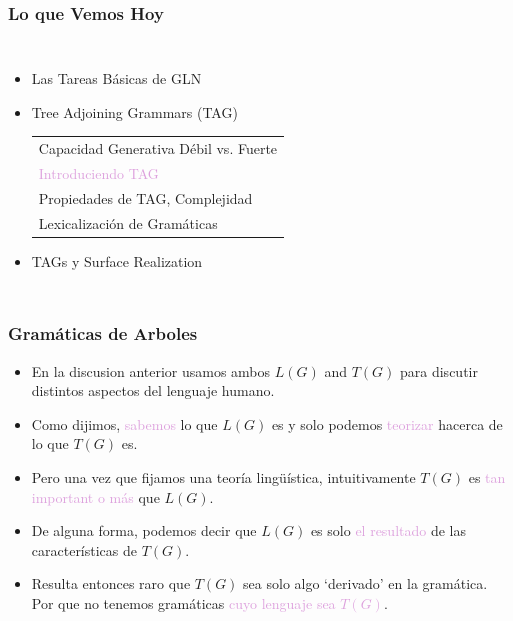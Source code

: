 \documentclass[compress,color=usenames]{beamer}
\newcommand{\mH}[1]{\textcolor{Plum}{#1}}
\begin{document}
\begin{frame}
\frametitle{Lo que Vemos Hoy}

\begin{columns}
\begin{itemize}
\item Las Tareas B\'asicas de GLN
\item Tree Adjoining Grammars (TAG)
\begin{tabular}{|l}
Capacidad Generativa D\'ebil vs. Fuerte\\
\mH{Introduciendo TAG}\\
Propiedades de TAG, Complejidad\\
Lexicalizaci\'on de Gram\'aticas
\end{tabular}

\item TAGs y Surface Realization
\end{itemize}
\end{columns}
\end{frame}


\begin{frame}
\frametitle{Gram\'aticas de Arboles}

\begin{itemize}

\item En la discusion anterior usamos ambos $L(G)$ and $T(G)$ para discutir
distintos aspectos del lenguaje humano.

\item Como dijimos, \mH{sabemos} lo que $L(G)$ es y solo podemos \mH{teorizar}
hacerca de lo que $T(G)$ es. \pause

\item Pero una vez que fijamos una teor\'ia ling\"u\'istica, intuitivamente $T(G)$ 
es \mH{tan important o m\'as} que $L(G)$. 

\item De alguna forma, podemos decir que $L(G)$ es solo \mH{el resultado} de 
las caracter\'isticas de $T(G)$.  \pause

\item Resulta entonces raro que $T(G)$ sea solo algo `derivado' en la gram\'atica. 
Por que no tenemos gram\'aticas \mH{cuyo lenguaje sea $T(G)$}. 

\end{itemize}
\end{frame}
\end{document}
